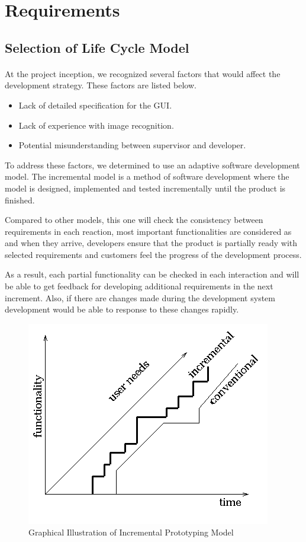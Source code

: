\section{Requirements}
\label{sec:Requirements}

\subsection{Selection of Life Cycle Model}
\paragraph{} At the project inception, we recognized several factors that would affect the development strategy. These factors are listed below.
\begin{itemize}
\item Lack of detailed specification for the GUI.
\item Lack of experience with image recognition.
\item Potential misunderstanding between supervisor and developer.
\end{itemize}
\par To address these factors, we determined to use an adaptive software development model. The incremental model is a method of software development where the model is designed, implemented and tested incrementally until the product is finished. 
\par Compared to other models, this one will check the consistency between requirements in each reaction, most important functionalities are considered as and when they arrive, developers ensure that the product is partially ready with selected requirements and customers feel the progress of the development process.
\par As a result, each partial functionality can be checked in each interaction and will be able to get feedback for developing additional requirements in the next increment. Also, if there are changes made during the development system development would be able to response to these changes rapidly.

\begin{figure}[htb]
\centering
\includegraphics[width=.5\textwidth]{section02/assets/IncrementalModel.png}
\caption[Short Caption 2]{\label{IncrmentalModel}Graphical Illustration of Incremental Prototyping Model}
\end{figure}

